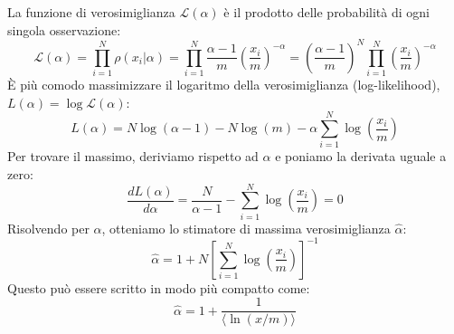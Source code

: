 La funzione di verosimiglianza $\mathcal{L}(\alpha)$ è il prodotto delle probabilità di ogni singola osservazione:
\begin{equation}
\mathcal{L}(\alpha) = \prod_{i=1}^N \rho(x_i|\alpha) = \prod_{i=1}^N \frac{\alpha-1}{m} \left(\frac{x_i}{m}\right)^{-\alpha} = \left(\frac{\alpha-1}{m}\right)^N \prod_{i=1}^N \left(\frac{x_i}{m}\right)^{-\alpha}
\end{equation}
È più comodo massimizzare il logaritmo della verosimiglianza (log-likelihood), $L(\alpha) = \log\mathcal{L}(\alpha)$:
\begin{equation}
L(\alpha) = N\log(\alpha-1) - N\log(m) - \alpha \sum_{i=1}^N \log\left(\frac{x_i}{m}\right)
\end{equation}
Per trovare il massimo, deriviamo rispetto ad $\alpha$ e poniamo la derivata uguale a zero:
\begin{equation}
\frac{dL(\alpha)}{d\alpha} = \frac{N}{\alpha-1} - \sum_{i=1}^N \log\left(\frac{x_i}{m}\right) = 0
\end{equation}
Risolvendo per $\alpha$, otteniamo lo stimatore di massima verosimiglianza $\hat{\alpha}$:
\begin{equation}
\hat{\alpha} = 1 + N \left[ \sum_{i=1}^N \log\left(\frac{x_i}{m}\right) \right]^{-1}
\end{equation}
Questo può essere scritto in modo più compatto come:
\begin{equation}
\hat{\alpha} = 1 + \frac{1}{\langle \ln(x/m) \rangle}
\end{equation}

